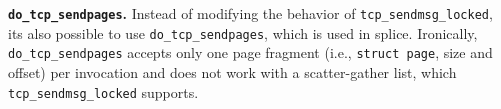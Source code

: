 \noindent \textbf{\texttt{do\_tcp\_sendpages}.}
Instead of modifying the behavior of \texttt{tcp\_sendmsg\_locked}, its also possible to use \texttt{do\_tcp\_sendpages}, which is used in splice. Ironically, \texttt{do\_tcp\_sendpages} accepts only one page fragment (i.e., \texttt{struct page}, size and offset) per invocation and does not work with a scatter-gather list, which \texttt{tcp\_sendmsg\_locked} supports.

